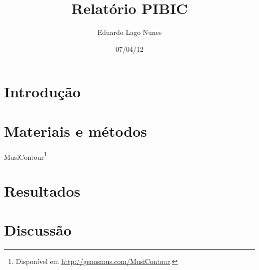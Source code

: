 \documentclass[a4paper,12pt]{article}
\author{Eduardo Lago Nunes}
\title{Relatório PIBIC}
\date{07/04/12}
\begin{document}
\maketitle

\section{Introdução}
\label{sec:introducao}


\section{Materiais e métodos}
\label{sec:materiais}

MusiContour\footnote{Disponível em \url{http://genosmus.com/MusiContour}.}

\section{Resultados}
\label{sec:resultados}


\section{Discussão}
\label{sec:discussao}
\end{document}
